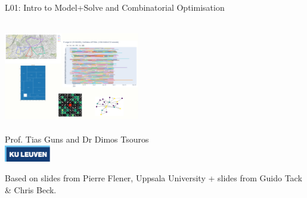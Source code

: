 \documentclass{cons-beamer}
\begin{document}
\begin{frame}{L01: Intro to Model+Solve and Combinatorial Optimisation}
  \begin{center}
    ~ \\
    \includegraphics[height=38mm]{images/CO_examples} \\
    ~ \\
    Prof. Tias Guns and Dr Dimos Tsouros \\[0.5em]
    \includegraphics[width=2cm]{images/kuleuven_CMYK_logo.pdf}
  \end{center}
  
  {\footnotesize 
  Based on slides from Pierre Flener, Uppsala University + slides from Guido Tack \& Chris Beck.}
\end{frame}
\end{document}
